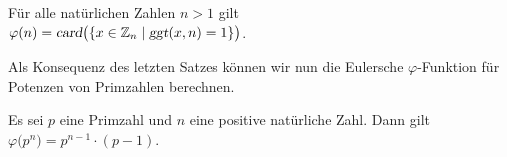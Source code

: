 \begin{Korollar} \label{korollar:phi}
Für alle natürlichen Zahlen $n > 1$ gilt
\\[0.2cm]
\hspace*{1.3cm}
$\varphi(n) = \textsl{card}\bigl(\{x \in \mathbb{Z}_{n} \mid \textsl{ggt}(x, n) = 1 \}\bigr)$. 
\end{Korollar}


\noindent
Als Konsequenz des letzten Satzes können wir nun die Eulersche $\varphi$-Funktion für Potenzen von
Primzahlen berechnen.

\begin{Satz}
\label{satz:phi_primzahl} 
Es sei $p$ eine Primzahl und $n$ eine positive natürliche Zahl.  Dann gilt
\\[0.2cm]
\hspace*{1.3cm}
$\varphi\bigl(p^n\bigr) = p^{n-1} \cdot (p - 1)$.  
\end{Satz}

